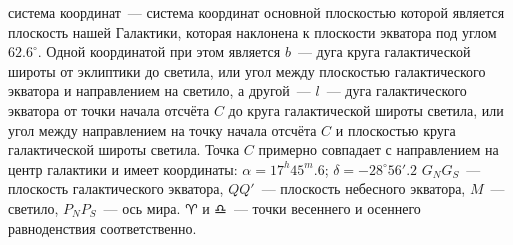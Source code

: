  система координат~--- система координат основной плоскостью которой является плоскость нашей Галактики, которая наклонена к плоскости экватора под углом $62.6^{\circ}$. Одной координатой при этом является  $b$~--- дуга круга галактической широты от эклиптики до светила, или угол между плоскостью галактического экватора и направлением на светило, а другой~---  $l$~--- дуга галактического экватора от точки начала отсчёта $C$ до круга галактической широты светила, или угол между направлением на точку начала отсчёта $C$ и плоскостью круга галактической широты светила. Точка $C$ примерно совпадает с направлением на центр галактики и имеет координаты: $\alpha=17^h45^m.6$; $\delta=-28^{\circ}56'.2$ $G_NG_S$~--- плоскость галактического экватора, $QQ'$~--- плоскость небесного экватора, $M$~--- светило, $P_N P_S$~--- ось мира. $\aries$ и $\libra$~--- точки весеннего и осеннего равноденствия соответственно.